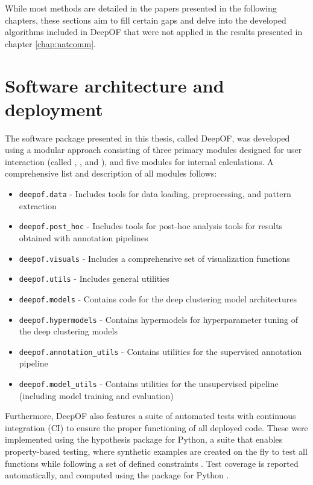 \noindent While most methods are detailed in the papers presented in the following chapters, these sections aim to fill certain gaps and delve into the developed algorithms included in DeepOF that were not applied in the results presented in chapter \ref{chap:natcomm}.
 
\section{Software architecture and deployment}

The software package presented in this thesis, called DeepOF, was developed using a modular approach consisting of three primary modules designed for user interaction (called , , and ), and five modules for internal calculations. A comprehensive list and description of all modules follows:

\begin{itemize}
    \item \texttt{deepof.data} - Includes tools for data loading, preprocessing, and pattern extraction
    \item \texttt{deepof.post\_hoc} - Includes tools for post-hoc analysis tools for results obtained with annotation pipelines
    \item \texttt{deepof.visuals} - Includes a comprehensive set of visualization functions
    \item \texttt{deepof.utils} - Includes general utilities
    \item \texttt{deepof.models} - Contains code for the deep clustering model architectures
    \item \texttt{deepof.hypermodels} - Contains hypermodels for hyperparameter tuning of the deep clustering models
    \item \texttt{deepof.annotation\_utils} - Contains utilities for the supervised annotation pipe\-line
    \item \texttt{deepof.model\_utils} - Contains utilities for the unsupervised pipeline (including model training and evaluation)
\end{itemize}


Furthermore, DeepOF also features a suite of automated tests with continuous integration (CI) to ensure the proper functioning of all deployed code. These were implemented using the hypothesis package for Python, a suite that enables property-based testing, where synthetic examples are created on the fly to test all functions while following a set of defined constraints \cite{Maciver2019Hypothesis:Testing}. Test coverage is reported automatically, and computed using the  package for Python \cite{Coverage.pyDocumentation}. 

